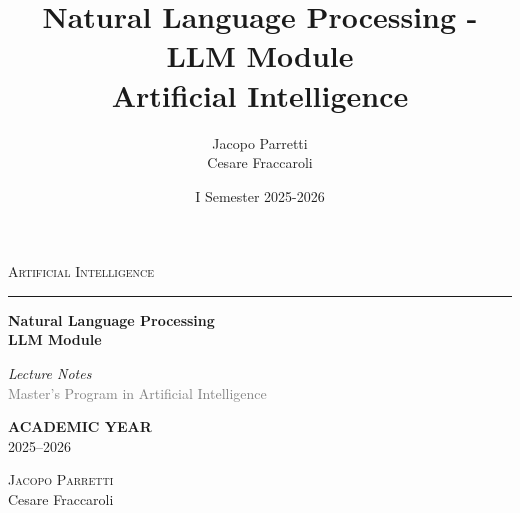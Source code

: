 \documentclass[11pt,a4paper]{article}
\title{\textbf{Natural Language Processing - LLM Module}\\
\large Artificial Intelligence}
\author{Jacopo Parretti \\ Cesare Fraccaroli}
\date{I Semester 2025-2026}
\theoremstyle{definition}
\theoremstyle{plain}
\theoremstyle{remark}
\begin{document}
\begin{titlepage}
    \begin{center}
        \vspace*{2cm}
        
        {\large\textsc{Artificial Intelligence}}
        
        \vspace{0.4cm}
        \textcolor{blue!60!black}{\rule{0.5\textwidth}{1pt}}
        
        \vspace{2.5cm}
        
        {\fontsize{36}{44}\selectfont\bfseries Natural Language Processing\\[0.5cm] LLM Module}
        
        \vspace{1.5cm}
        
        \begin{tcolorbox}[
            colback=blue!3!white,
            colframe=blue!40!black,
            width=0.6\textwidth,
            arc=1mm,
            boxrule=0.8pt,
            left=15pt,
            right=15pt,
            top=10pt,
            bottom=10pt
        ]
            \centering
            {\large\textit{Lecture Notes}}\\[0.3cm]
            \textcolor{gray}{Master's Program in Artificial Intelligence}
        \end{tcolorbox}
        
        \vfill
        
        \begin{tcolorbox}[
            enhanced,
            colback=white,
            colframe=gray!30,
            width=0.5\textwidth,
            arc=0mm,
            boxrule=0.5pt,
            left=20pt,
            right=20pt,
            top=12pt,
            bottom=12pt,
            shadow={2mm}{-2mm}{0mm}{black!10}
        ]
            \centering
            {\small\textcolor{gray!70}{\textbf{ACADEMIC YEAR}}}\\[0.4cm]
            {\Large 2025--2026}
        \end{tcolorbox}
        
        \vspace{2cm}
        
        {\LARGE\textsc{Jacopo Parretti}\\[0.3cm]Cesare Fraccaroli}
        
        \vspace{1.5cm}
        
    \end{center}
\end{titlepage}
\end{document}
